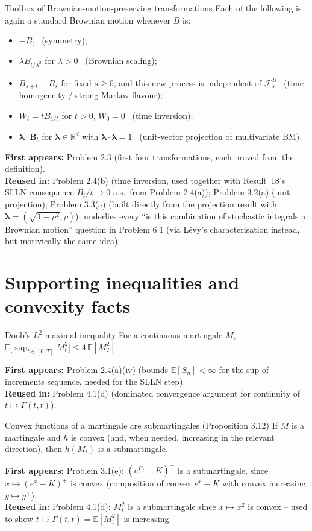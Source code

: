 \documentclass[11pt]{article}
\newcommand{\R}{\mathbb{R}}
\newcommand{\E}{\mathbb{E}}
\newcommand{\F}{\mathcal F}
\newcommand{\used}[2]{\begin{sourcebox}\textbf{First appears:} #1 \\ \textbf{Reused in:} #2\end{sourcebox}}
\begin{document}
\begin{result}{Toolbox of Brownian-motion-preserving transformations}
\label{res:18}
Each of the following is again a standard Brownian motion whenever $B$ is:
\begin{itemize}
\item $-B_t$ \ (symmetry);
\item $\lambda B_{t/\lambda^2}$ for $\lambda>0$ \ (Brownian scaling);
\item $B_{s+t}-B_s$ for fixed $s\ge0$, and this new process is independent of
$\F^B_s$ \ (time-homogeneity / strong Markov flavour);
\item $W_t=tB_{1/t}$ for $t>0$, $W_0=0$ \ (time inversion);
\item $\boldsymbol\lambda\cdot\boldsymbol B_t$ for $\boldsymbol\lambda\in\R^d$
with $\boldsymbol\lambda\cdot\boldsymbol\lambda=1$ \ (unit-vector projection of
multivariate BM).
\end{itemize}
\end{result}
\used{Problem 2.3 (first four transformations, each proved from the
definition).}{Problem 2.4(b) (time inversion, used together with Result~18's
SLLN consequence $B_t/t\to0$ a.s.\ from Problem 2.4(a)); Problem 3.2(a) (unit
projection); Problem 3.3(a) (built directly from the projection result with
$\boldsymbol\lambda=(\sqrt{1-\rho^2},\rho)$); underlies every ``is this
combination of stochastic integrals a Brownian motion'' question in Problem 6.1
(via Lévy's characterisation instead, but motivically the same idea).}

\section{Supporting inequalities and convexity facts}

\begin{result}{Doob's $L^2$ maximal inequality}
\label{res:19}
For a continuous martingale $M$, $\E\big[\sup_{t\in[0,T]}M_t^2\big]\le4\,\E[M_T^2]$.
\end{result}
\used{Problem 2.4(a)(iv) (bounds $\E[S_n]<\infty$ for the sup-of-increments
sequence, needed for the SLLN step).}{Problem 4.1(d) (dominated convergence
argument for continuity of $t\mapsto\Gamma(t,t)$).}

\begin{result}{Convex functions of a martingale are submartingales (Proposition
3.12)}
\label{res:21}
If $M$ is a martingale and $h$ is convex (and, when needed, increasing in the
relevant direction), then $h(M_t)$ is a submartingale.
\end{result}
\used{Problem 3.1(e): $(e^{B_t}-K)^+$ is a submartingale, since $x\mapsto
(e^x-K)^+$ is convex (composition of convex $e^x-K$ with convex increasing
$y\mapsto y^+$).}{Problem 4.1(d): $M_t^2$ is a submartingale since $x\mapsto x^2$
is convex -- used to show $t\mapsto\Gamma(t,t)=\E[M_t^2]$ is increasing.}
\end{document}
